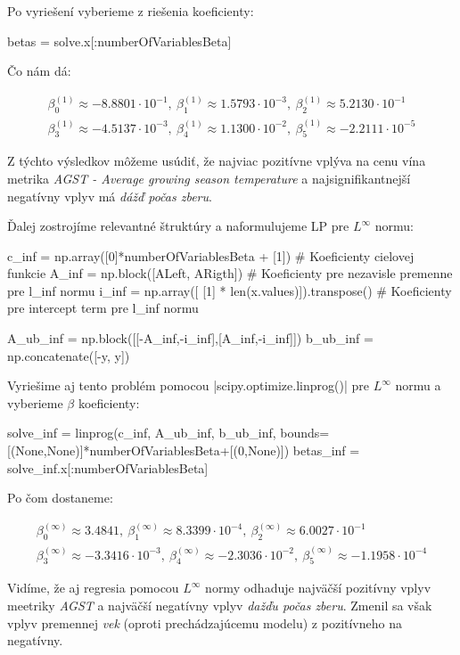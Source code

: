 \documentclass[report.tex]{subfiles}
\begin{document}
Po vyriešení vyberieme z riešenia koeficienty:

\begin{python}
betas = solve.x[:numberOfVariablesBeta]
\end{python}

Čo nám dá: 

\begin{gather*}
	\beta_0^{(1)} \approx -8.8801 \cdot 10^{-1} ,~\beta_1^{(1)} \approx 1.5793\cdot 10^{-3},~\beta_2^{(1)} \approx 5.2130\cdot 10^{-1} \\
	\beta_3^{(1)} \approx -4.5137\cdot 10^{-3} ,~\beta_4^{(1)} \approx 1.1300\cdot 10^{-2}  ,~\beta_5^{(1)} \approx -2.2111\cdot 10^{-5}
\end{gather*}

Z týchto výsledkov môžeme usúdiť, že najviac pozitívne vplýva na cenu vína metrika \textit{AGST - Average growing season temperature} a najsignifikantnejší negatívny vplyv má \textit{dážď počas zberu}.


\newpage

Ďalej zostrojíme relevantné štruktúry a naformulujeme LP pre $L^{\infty}$ normu:

\begin{python}
c_inf = np.array([0]*numberOfVariablesBeta + [1]) # Koeficienty cielovej funkcie
A_inf = np.block([ALeft, ARigth]) # Koeficienty pre nezavisle premenne pre l_inf normu
i_inf = np.array([ [1] * len(x.values)]).transpose() # Koeficienty pre intercept term pre l_inf normu

A_ub_inf = np.block([[-A_inf,-i_inf],[A_inf,-i_inf]])
b_ub_inf = np.concatenate([-y, y]) 
\end{python}

Vyriešime aj tento problém pomocou \pyth|scipy.optimize.linprog()| pre $L^{\infty}$ normu a vyberieme $\beta$ koeficienty:

\begin{python}
solve_inf = linprog(c_inf, A_ub_inf, b_ub_inf, bounds=[(None,None)]*numberOfVariablesBeta+[(0,None)])
betas_inf = solve_inf.x[:numberOfVariablesBeta]
\end{python}

Po čom dostaneme:

\begin{gather*}
	\beta_0^{(\infty)} \approx  3.4841 ,~\beta_1^{(\infty)} \approx 8.3399\cdot 10^{-4} ,~\beta_2^{(\infty)} \approx 6.0027\cdot 10^{-1} \\
	\beta_3^{(\infty)} \approx -3.3416\cdot 10^{-3} ,~\beta_4^{(\infty)} \approx -2.3036\cdot 10^{-2}  ,~\beta_5^{(\infty)} \approx -1.1958\cdot 10^{-4}
\end{gather*}

Vidíme, že aj regresia pomocou $L^{\infty}$ normy odhaduje najväčší pozitívny vplyv meetriky \textit{AGST} a najväčší negatívny vplyv \textit{dažďu počas zberu}. Zmenil sa však vplyv premennej \textit{vek} (oproti prechádzajúcemu modelu) z pozitívneho na negatívny.
\end{document}
